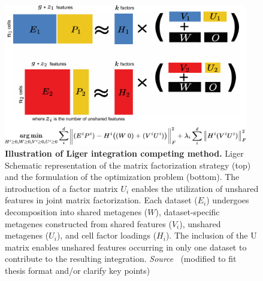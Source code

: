 \begin{figure}[!ht]
	\centering
	\includegraphics[width=0.95\textwidth]{Alg_Liger/fig}
	\vspace{0.1cm}
	\caption[Illustration of Liger integration competing method.]{\textbf{Illustration of Liger integration competing method.} Liger Schematic representation of the matrix factorization strategy (top) and the formulation of the optimization problem (bottom). The introduction of a factor matrix $U_i$ enables the utilization of unshared features in joint matrix factorization. Each dataset ($E_i$) undergoes decomposition into shared metagenes ($W$), dataset-specific metagenes constructed from shared features ($V_i$), unshared metagenes ($U_i$), and cell factor loadings ($H_i$). The inclusion of the U matrix enables unshared features occurring in only one dataset to contribute to the resulting integration. \emph{Source ~\cite{kriebel2022uinmf}}(modified to fit thesis format and/or clarify key points)
}
	\label{fig:Alg_Liger}
\end{figure}



